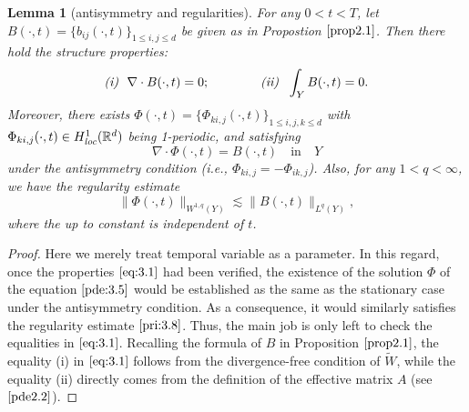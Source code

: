 \documentclass[13pt,CJK]{article}
\theoremstyle{plain}                       %
\newtheorem{lemma}{Lemma}[section]
\theoremstyle{remark}
\numberwithin{equation}{section}
\begin{document}
\begin{lemma}[antisymmetry and regularities]\label{flux}
For any $0<t<T$, let $B(\cdot,t)=\{b_{ij}(\cdot,t)\}_{1\leq i,j\leq d}$
be given as in Propostion $\ref{prop2.1}$. Then there hold
the structure properties:
\begin{equation}\label{eq:3.1}
\emph{(i)}~~\nabla\cdot B(\cdot,t)=0;\qquad\qquad
\emph{(ii)}~~\int_{Y}B(\cdot,t)=0.
\end{equation}
Moreover, there exists $\Phi(\cdot,t)=\{\Phi_{ki,j}(\cdot,t)\}_{1\leq i,j,k\leq d}$
with $\Phi_{ki,j}(\cdot,t)\in H^{1}_{\emph{loc}}(\mathbb{R}^d)$
being 1-periodic, and satisfying
\begin{equation}\label{pde:3.5}
 \nabla \cdot \Phi(\cdot, t) =
 B(\cdot,t)\quad \text{in}\quad Y
\end{equation}
under the antisymmetry condition (i.e., $\Phi_{ki,j}=-\Phi_{ik,j}$).
Also, for any $1<q<\infty$, we have the regularity estimate
\begin{equation}\label{pri:3.8}
\|\Phi(\cdot,t)\|_{W^{1,q}(Y)}\lesssim \|B(\cdot,t)\|_{L^q(Y)},
\end{equation}
where the up to constant is independent of $t$.
\end{lemma}

\begin{proof}
Here we merely treat temporal variable as a parameter. In this regard,
once the properties $\eqref{eq:3.1}$ had been verified, the existence of
the solution $\Phi$ of the equation $\eqref{pde:3.5}$ would be established as
the same as the stationary case
under the antisymmetry condition. As a consequence,
it would similarly satisfies the regularity
estimate $\eqref{pri:3.8}$. Thus, the main job is only left to check the equalities
in $\eqref{eq:3.1}$. Recalling the formula of $B$ in Proposition $\ref{prop2.1}$,
the equality (i) in $\eqref{eq:3.1}$ follows from the divergence-free condition of $\tilde{W}$,
while the equality (ii) directly comes from the definition of the effective matrix $A$ (see $\eqref{pde2.2}$).
\end{proof}
\end{document}
